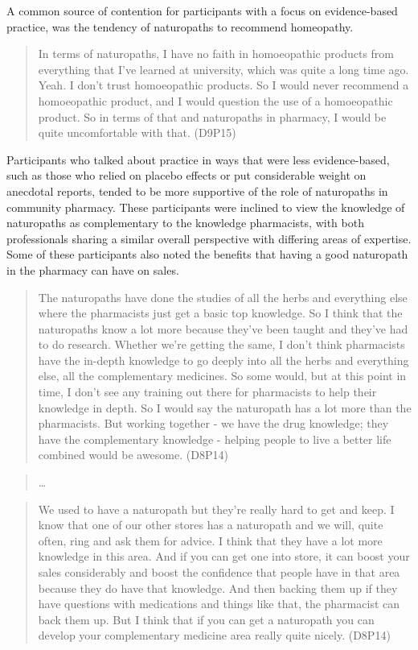 \documentclass[11pt,a4paper]{article}
\begin{document}
A common source of contention for participants with a focus on
evidence-based practice, was the tendency of naturopaths to recommend
homeopathy.

\begin{quote}
In terms of naturopaths, I have no faith in homoeopathic products from
everything that I've learned at university, which was quite a long time
ago. Yeah. I don't trust homoeopathic products. So I would never
recommend a homoeopathic product, and I would question the use of a
homoeopathic product. So in terms of that and naturopaths in pharmacy, I
would be quite uncomfortable with that. (D9P15)
\end{quote}

Participants who talked about practice in ways that were less
evidence-based, such as those who relied on placebo effects or put
considerable weight on anecdotal reports, tended to be more supportive
of the role of naturopaths in community pharmacy. These participants
were inclined to view the knowledge of naturopaths as complementary to
the knowledge pharmacists, with both professionals sharing a similar
overall perspective with differing areas of expertise. Some of these
participants also noted the benefits that having a good naturopath in
the pharmacy can have on sales.

\begin{quote}
The naturopaths have done the studies of all the herbs and everything
else where the pharmacists just get a basic top knowledge. So I think
that the naturopaths know a lot more because they've been taught and
they've had to do research. Whether we're getting the same, I don't
think pharmacists have the in-depth knowledge to go deeply into all the
herbs and everything else, all the complementary medicines. So some
would, but at this point in time, I don't see any training out there for
pharmacists to help their knowledge in depth. So I would say the
naturopath has a lot more than the pharmacists. But working together -
we have the drug knowledge; they have the complementary knowledge -
helping people to live a better life combined would be awesome. (D8P14)
\end{quote}

\begin{quote}
\ldots{}
\end{quote}

\begin{quote}
We used to have a naturopath but they're really hard to get and keep. I
know that one of our other stores has a naturopath and we will, quite
often, ring and ask them for advice. I think that they have a lot more
knowledge in this area. And if you can get one into store, it can boost
your sales considerably and boost the confidence that people have in
that area because they do have that knowledge. And then backing them up
if they have questions with medications and things like that, the
pharmacist can back them up. But I think that if you can get a
naturopath you can develop your complementary medicine area really quite
nicely. (D8P14)
\end{quote}
\end{document}
